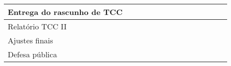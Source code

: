 {\begin{tabular}{|X p{5cm}|c|c|c|c|c|c|c|c|c|c|c|c|}
		\hiderowcolors Entrega do rascunho de TCC                                &                        &                        &                        &                        &                        &                        &                        &                        &                        & \cellcolor{shadecolor} &                        &                        \\ \hline

		\hiderowcolors Relatório TCC II                                          &                        &                        &                        &                        &                        &                        &                        &                        &                        & \cellcolor{shadecolor} & \cellcolor{shadecolor} &
		\\ \hline

		\hiderowcolors Ajustes finais                                            &                        &                        &                        &                        &                        &                        &                        &                        &                        &                        & \cellcolor{shadecolor} &                        \\ \hline

		\hiderowcolors Defesa pública                                            &                        &                        &                        &                        &                        &                        &                        &                        &                        &                        &                        & \cellcolor{shadecolor} \\ \hline
	\end{tabular}
}




